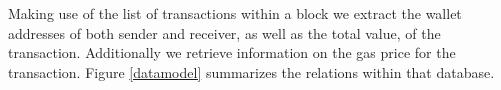 Making use of the list of transactions within a block we extract the wallet addresses of both sender and receiver, as well as the total value, of the transaction. Additionally we retrieve information on the gas price for the transaction. Figure \ref{datamodel} summarizes the relations within that database.
